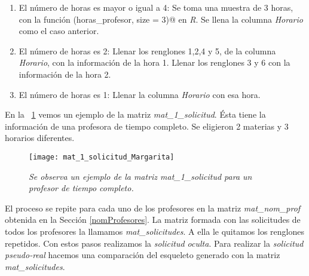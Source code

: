\begin{enumerate}
\begin{enumerate}
\item El número de horas es mayor o igual a 4: Se toma una muestra de 3 horas, con la función \verb@sample(horas_profesor, size = 3)@ en \textit{R}. Se llena la columna \textit{Horario} como el caso anterior.

\item El número de horas es 2: Llenar los renglones 1,2,4 y 5, de la columna \textit{Horario}, con la información de la hora 1. Llenar los renglones 3 y 6 con la información de la hora 2.

\item El número de horas es 1: Llenar la columna \textit{Horario} con esa hora.
\end{enumerate}
\end{enumerate}

En la \figurename{~\ref{mat_1_solicitud_Margarita}} vemos un ejemplo de la matriz \textit{mat\_1\_solicitud}. Ésta tiene la información de una profesora de tiempo completo. Se eligieron 2 materias y 3 horarios diferentes.

\begin{figure}[H]
\centering
\texttt{[image: mat\_1\_solicitud\_Margarita]} %
\caption[\textit{Matriz de solicitudes de un profesor}]{\textit{Se observa un ejemplo de la matriz mat\_1\_solicitud para un profesor de tiempo completo.}}\label{mat_1_solicitud_Margarita}
\end{figure}

El proceso se repite para cada uno de los profesores en la matriz \textit{mat\_nom\_prof} obtenida en la Sección \ref{nomProfesores}. La matriz formada con las solicitudes de todos los profesores la llamamos \textit{mat\_solicitudes}. A ella le quitamos los renglones repetidos. Con estos pasos realizamos la \textit{solicitud oculta}. Para realizar la \textit{solicitud pseudo-real} hacemos una comparación del esqueleto generado con la matriz \textit{mat\_solicitudes}.
